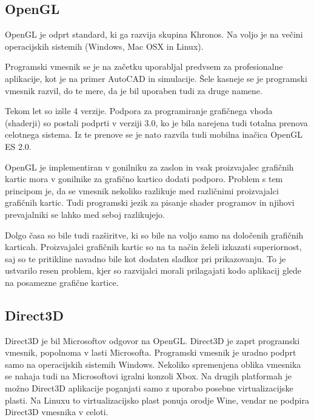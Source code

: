 


\subsection{OpenGL}

OpenGL je odprt standard, ki ga razvija skupina Khronos. Na voljo je na večini operacijskih sistemih (Windows, Mac OSX in Linux).

Programski vmesnik se je na začetku uporabljal predvsem za profesionalne aplikacije, kot je na primer AutoCAD in simulacije. Šele kasneje se je programski vmesnik razvil, do te mere, da je bil uporaben tudi za druge namene.

Tekom let so izšle 4 verzije. Podpora za programiranje grafičnega vhoda (shaderji) so postali podprti v verziji 3.0, ko je bila narejena tudi totalna prenova celotnega sistema. Iz te prenove se je nato razvila tudi mobilna inačica OpenGL ES 2.0.  

OpenGL je implementiran v gonilniku za zaslon in vsak proizvajalec grafičnih kartic mora v gonilnike za grafično kartico dodati podporo. Problem s tem principom je, da se vmesnik nekoliko razlikuje med različnimi proizvajalci grafičnih kartic. Tudi programski jezik za pisanje shader programov in njihovi prevajalniki se lahko med seboj razlikujejo.

Dolgo časa so bile tudi razširitve, ki so bile na voljo samo na določenih grafičnih karticah. Proizvajalci grafičnih kartic so na ta način želeli izkazati superiornost, saj so te pritikline navadno bile kot dodaten sladkor pri prikazovanju. To je ustvarilo resen problem, kjer so razvijalci morali prilagajati kodo aplikacij glede na posamezne grafične kartice.


\subsection{Direct3D}

Direct3D je bil Microsoftov odgovor na OpenGL. Direct3D je zaprt programski vmesnik, popolnoma v lasti Microsofta. Programski vmesnik je uradno podprt samo na operacijskih sistemih Windows. Nekoliko spremenjena oblika vmesnika se nahaja tudi na Microsoftovi igralni konzoli Xbox. Na drugih platformah je možno Direct3D aplikacije poganjati samo z uporabo posebne virtualizacijske plasti. Na Linuxu to virtualizacijsko plast ponuja orodje Wine, vendar ne podpira Direct3D vmesnika v celoti.


